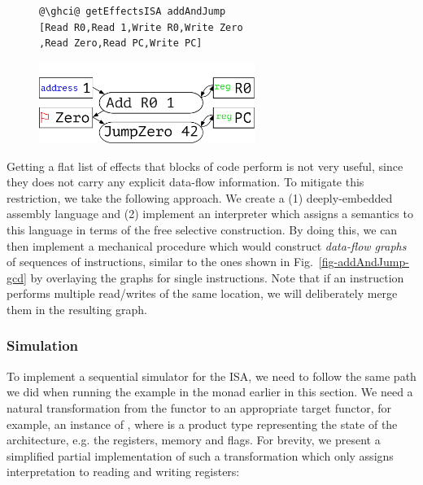 \begin{figure}[!h]
 \begin{minipage}{0.45\textwidth}
\raggedleft
\begin{verbatim}
@\ghci@ getEffectsISA addAndJump
[Read R0,Read 1,Write R0,Write Zero
,Read Zero,Read PC,Write PC]
\end{verbatim}
 \end{minipage}
 \begin{minipage}{0.45\textwidth}
  \centering
\includegraphics[width=7cm]{./fig/addAndJump.pdf}
 \end{minipage}
\end{figure}


Getting a flat list of effects that blocks of code perform is not very useful,
since they does not carry any explicit data-flow information. To mitigate this restriction,
we take the following approach. We create a (1) deeply-embedded assembly language and
(2) implement an interpreter which assigns a semantics to this language in terms of the
free selective construction. By doing this, we can then implement a mechanical procedure
which would construct \emph{data-flow graphs} of sequences of instructions, similar to
the ones shown in Fig.~\ref{fig-addAndJump-gcd} by overlaying the graphs for single instructions.
Note that if an instruction performs multiple read/writes of the same location, we will
deliberately merge them in the resulting graph.

\subsubsection{\textbf{Simulation}}

To implement a sequential simulator for the ISA, we need to follow the same path we did
when running the  example in the  monad earlier in this section.
We need a natural transformation from the functor  to an appropriate target functor,
for example, an instance of , where  is a product
type representing the state of the architecture, e.g. the registers, memory and flags.
For brevity, we present a simplified partial implementation of such a transformation which
only assigns interpretation to reading and writing registers:

